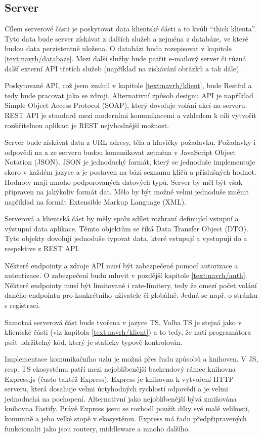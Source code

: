 \subsection{Server}

Cílem serverové části je poskytovat data klientské části a to kvůli \enquote{thick klienta}. 
Tyto data bude server získávat z dalších služeb a zejména z databáze, ve které budou data perzistentně uložena.
O databázi budu rozepisovat v kapitole \ref{text:navrh/databaze}.
Mezi další služby bude patřit e-mailový server či různá další externí API třetích služeb (například na získávání obrázků a tak dále).

Poskytované API, což jsem zmínil v kapitole \ref{text:navrh/klient}, bude Restful a tedy bude pracovat jako se zdroji. 
Alternativní způsob designu API je například Simple Object Access Protocol (SOAP), který dovoluje volání akcí na serveru.
REST API je standard mezi moderními komunikacemi a vzhledem k cíli vytvořit rozšiřitelnou aplikaci je REST nejvhodnější možnost.

Server bude získávat data z URL adresy, těla a hlavičky požadavku.
Požadavky i odpovědi na a ze serveru budou komunikovat zejména v JavaScript Object Notation (JSON).
JSON je jednoduchý formát, který se jednoduše implementuje skoro v každém jazyce a je postaven na bázi seznamu klíčů a příslušných hodnot.
Hodnoty mají mnoho podporovaných datových typů.
Server by měl být však připraven na jakýkoliv formát dat.
Mělo by být možné velmi jednoduše změnit například na formát Extensible Markup Language (XML).

Serverová a klientská část by měly spolu sdílet rozhraní definující vstupní a výstupní data aplikace.
Těmto objektům se říká Data Transfer Object (DTO).
Tyto objekty dovolují jednoduše typovat data, které vstupují a vystupují do a respektive z REST API.

Některé endpointy a zdroje API musí být zabezpečené pomocí autorizace a autentizace. 
O zabezpečení budu mluvit v pozdější kapitole \ref{text:navrh/auth}.
Některé endpointy musí být limitované i rate-limitery, tedy že omezí počet volání daného endpointu pro konkrétního uživatele či globálně.
Jedná se např. o stránku s registrací.

Samotná serverová část bude tvořena v jazyce TS.
Volba TS je stejná jako v klientské části (viz kapitola \ref{text:navrh/klient}) a to tedy, že nutí programátora psát udržitelný kód, který je staticky typově kontrolován.

Implementace komunikačního uzlu je možná přes řadu způsobů a knihoven.
V JS, resp. TS ekosystému patří mezi nejoblíbenější backendový rámec knihovna Express.js (často taktéž Express).
Express je knihovna k vytvoření HTTP serveru, která dosahuje velmi úctyhodných rychlostí odpovědi a je velmi jednoduchá na pochopení.
Alternativní jako nejoblíbenější bývá zmiňována knihovna Fastify.
Právě Express jsem se rozhodl použít díky své malé velikosti, komunitě a jeho velké stopě v ekosystému.
Express má řadu předpřipravených funkcionalit jako jsou routery, middleware a mnoho dalšího.

